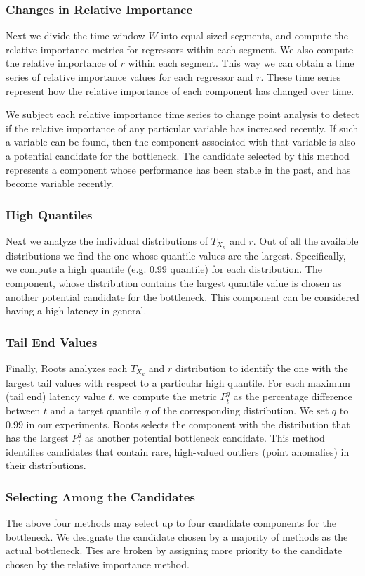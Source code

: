 \subsubsection{Changes in Relative Importance}
Next we divide the time window $W$ into equal-sized segments,
and compute the relative importance metrics for regressors within each segment. We also compute the
relative importance of $r$ within each segment. This way we can
obtain a time series of relative importance values for each regressor and $r$. These time series
represent how the relative importance of each component has changed over time.

We subject each relative importance time series to change point analysis to detect if the relative importance of any particular
variable has increased recently. If such a variable can be found, then the component
associated with that variable is also a potential candidate for the bottleneck. 
The candidate selected by this method represents
a component whose performance has been stable in the past, and has become variable recently. 

\subsubsection{High Quantiles}
\label{sec:highquantile}
Next we analyze the individual distributions of $T_{X_n}$ and $r$. 
Out of all the available distributions
we find the one whose quantile values are the largest.
Specifically, we compute a high
quantile (e.g. 0.99 quantile) for each distribution. The component, whose distribution 
contains the largest quantile value
is chosen as another potential candidate for the bottleneck. This component can be considered
having a high latency in general.

\subsubsection{Tail End Values}
\label{sec:tailend}
Finally, Roots analyzes each $T_{X_k}$ and $r$ distribution to identify the one 
with the largest tail values with respect to a particular high quantile.
For each maximum (tail end) latency value $t$, we compute the metric $P^q_t$ 
as the percentage difference between $t$ and a target quantile
$q$ of the corresponding distribution. We set $q$ to 0.99 in our experiments.
Roots selects the component with the 
distribution that has the largest $P^q_t$ as another potential bottleneck candidate.
This method identifies
candidates that contain rare, high-valued outliers (point anomalies) in their distributions.

\subsubsection{Selecting Among the Candidates}
The above four methods may select up to four candidate components for the bottleneck. 
We designate 
the candidate chosen by a majority of methods as the actual bottleneck. Ties
are broken by assigning more priority to the candidate chosen by the relative importance
method.